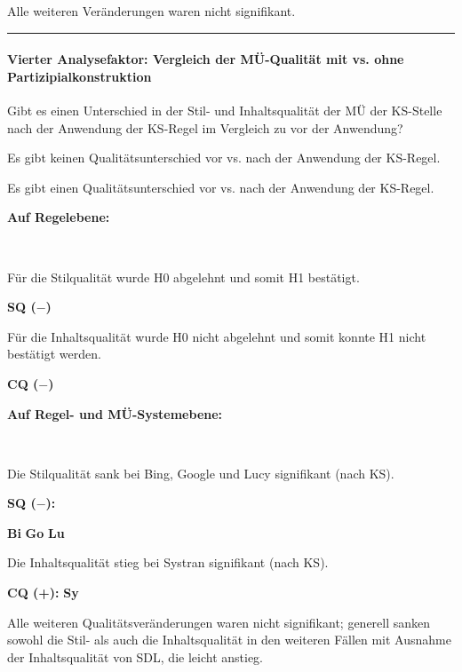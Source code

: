 \medskip
\noindent
\parbox[t]{.8\textwidth}{Alle weiteren Veränderungen waren nicht signifikant.}

\hrule
\paragraph*{Vierter Analysefaktor: Vergleich der MÜ-Qualität mit vs. ohne Partizipialkonstruktion}
\begin{description}[font=\normalfont\bfseries]
\item [Fragestellung:]  Gibt es einen Unterschied in der Stil- und Inhaltsqualität der MÜ der KS-Stelle nach der Anwendung der KS-Regel im Vergleich zu vor der Anwendung?
\item [H0 --] Es gibt keinen Qualitätsunterschied vor vs. nach der Anwendung der KS-Regel.
\item [H1 --] Es gibt einen Qualitätsunterschied vor vs. nach der Anwendung der KS-Regel.
\item [Resultat]
\end{description}
\noindent
\parbox[t]{.8\textwidth}{\textbf{Auf Regelebene:}}\\
\parbox[t]{.8\textwidth}{
Für die Stilqualität wurde H0 abgelehnt und somit H1 bestätigt.
}
\parbox[t]{.04\textwidth}{}
\colorbox{smGreen}{\parbox[t]{.15\textwidth}{
\textbf{SQ ($-$)}
}}

\medskip
\noindent
\parbox[t]{.8\textwidth}{
Für die Inhaltsqualität wurde H0 nicht abgelehnt und somit konnte H1 nicht bestätigt werden.
}
\parbox[t]{.04\textwidth}{}
\parbox[t]{.15\textwidth}{
\textbf{CQ ($-$)}
}

\noindent
\parbox[t]{.8\textwidth}{\textbf{Auf Regel- und MÜ-Systemebene:}}\\
\parbox[t]{.8\textwidth}{
Die Stilqualität sank bei Bing, Google und Lucy signifikant (nach KS).
}
\parbox[t]{.04\textwidth}{}
\colorbox{smGreen}{\parbox[t]{.15\textwidth}{
{ \textbf{SQ ($-$):}}

{ \textbf{Bi}}{ \textbf{Go}} \textbf{Lu}
}}

\medskip
\noindent
\parbox[t]{.8\textwidth}{
Die Inhaltsqualität stieg bei Systran signifikant (nach KS).
}
\parbox[t]{.04\textwidth}{}
\colorbox{smGreen}{\parbox[t]{.15\textwidth}{
{ \textbf{CQ (+):}} \textbf{Sy}
}}

\medskip
\noindent
\parbox[t]{.8\textwidth}{
Alle weiteren Qualitätsveränderungen waren nicht signifikant; generell sanken sowohl die Stil- als auch die Inhaltsqualität in den weiteren Fällen mit Ausnahme der Inhaltsqualität von SDL, die leicht anstieg.
}

